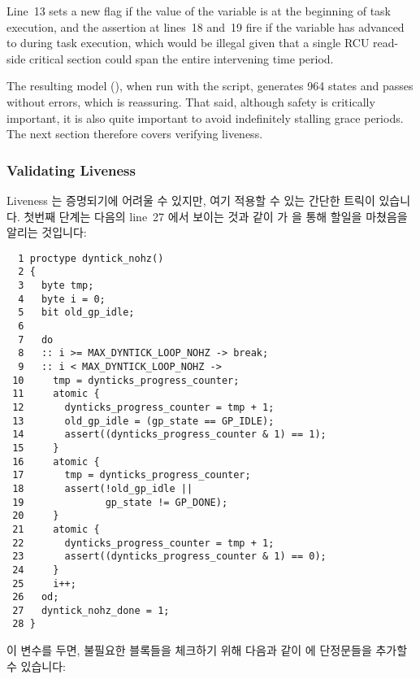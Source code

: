Line~13 sets a new  flag if the
value of the  variable is
 at the beginning of task execution,
and the assertion at lines~18 and~19 fire if the 
variable has advanced to  during task execution,
which would be illegal given that a single RCU read-side critical
section could span the entire intervening time period.

The resulting
model (),
when run with the  script,
generates 964 states and passes without errors, which is reassuring.
That said, although safety is critically important, it is also quite
important to avoid indefinitely stalling grace periods.
The next section therefore covers verifying liveness.
\fi

\subsubsection{Validating Liveness}
\label{sec:formal:Validating Liveness}

Liveness 는 증명되기에 어려울 수 있지만, 여기 적용할 수 있는 간단한 트릭이
있습니다.
첫번째 단계는 다음의 line~27 에서 보이는 것과 같이  가
 을 통해 할일을 마쳤음을 알리는 것입니다:
\iffalse

Although liveness can be difficult to prove, there is a simple
trick that applies here.
The first step is to make \co{dyntick_nohz()} indicate that
it is done via a \co{dyntick_nohz_done} variable, as shown on
line~27 of the following:
\fi

{ \scriptsize
\begin{verbatim}
  1 proctype dyntick_nohz()
  2 {
  3   byte tmp;
  4   byte i = 0;
  5   bit old_gp_idle;
  6
  7   do
  8   :: i >= MAX_DYNTICK_LOOP_NOHZ -> break;
  9   :: i < MAX_DYNTICK_LOOP_NOHZ ->
 10     tmp = dynticks_progress_counter;
 11     atomic {
 12       dynticks_progress_counter = tmp + 1;
 13       old_gp_idle = (gp_state == GP_IDLE);
 14       assert((dynticks_progress_counter & 1) == 1);
 15     }
 16     atomic {
 17       tmp = dynticks_progress_counter;
 18       assert(!old_gp_idle ||
 19              gp_state != GP_DONE);
 20     }
 21     atomic {
 22       dynticks_progress_counter = tmp + 1;
 23       assert((dynticks_progress_counter & 1) == 0);
 24     }
 25     i++;
 26   od;
 27   dyntick_nohz_done = 1;
 28 }
\end{verbatim}
}

이 변수를 두면, 불필요한 블록들을 체크하기 위해 다음과 같이 
에 단정문들을 추가할 수 있습니다:
\iffalse

